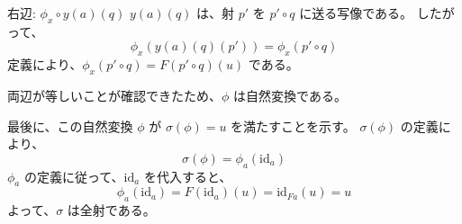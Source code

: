 \documentclass[uplatex,a4j,12pt,dvipdfmx]{jsarticle}
\begin{document}
右辺: $\phi_x \circ y(a)(q)$
$y(a)(q)$ は、射 $p'$ を $p' \circ q$ に送る写像である。
したがって、
$$ \phi_x(y(a)(q)(p')) = \phi_x(p' \circ q) $$
定義により、$\phi_x(p' \circ q) = F(p' \circ q)(u)$ である。

両辺が等しいことが確認できたため、$\phi$ は自然変換である。

最後に、この自然変換 $\phi$ が $\sigma(\phi) = u$ を満たすことを示す。
$\sigma(\phi)$ の定義により、
$$ \sigma(\phi) = \phi_a(\text{id}_a) $$
$\phi_a$ の定義に従って、$\text{id}_a$ を代入すると、
$$ \phi_a(\text{id}_a) = F(\text{id}_a)(u) = \text{id}_{Fa}(u) = u $$
よって、$\sigma$ は全射である。
\end{document}

